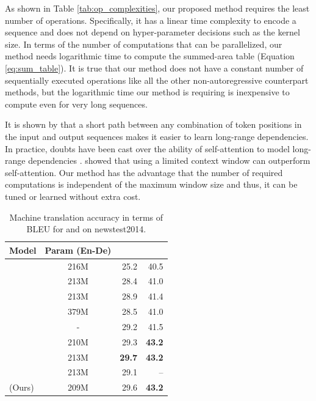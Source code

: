 \documentclass{article}
\begin{document}
As shown in Table \ref{tab:op_complexities}, our proposed method requires the least number of operations. Specifically, it has a linear time complexity to encode a sequence and does not depend on hyper-parameter decisions such as the kernel size. In terms of the number of computations that can be parallelized, our method needs logarithmic time to compute the summed-area table (Equation \ref{eq:sum_table}). It is true that our method does not have a constant number of sequentially executed operations like all the other non-autoregressive counterpart methods, but the logarithmic time our method is requiring is inexpensive to compute even for very long sequences. 

It is shown by \citet{5264952} that a short path between any combination of token positions in the input and output sequences makes it easier to learn long-range dependencies. In practice, doubts have been cast over the ability of self-attention to model long-range dependencies \cite{DBLP:journals/corr/abs-1808-08946,wu2019pay}. \citet{wu2019pay} showed that using a limited context window can outperform self-attention. Our method has the advantage that the number of required computations is independent of the maximum window size and thus, it can be tuned or learned without extra cost. 

\begin{table}[t]
\centering
\caption{Machine translation accuracy in terms of BLEU for \ende{} and \enfr{} on newstest2014.}
\vskip 0.15in
\begin{tabular}{lcrr}
\toprule
Model & Param (En-De) & \ende{} & \enfr{} \\
\midrule
\citet{gehring2017convolutional} & 216M & 25.2 & 40.5 \\
\citet{vaswani2017attention} & 213M & 28.4 & 41.0 \\
\citet{DBLP:journals/corr/abs-1711-02132} & 213M & 28.9 & 41.4 \\
\citet{DBLP:journals/corr/abs-1804-09849} & 379M & 28.5 & 41.0 \\
\citet{DBLP:journals/corr/abs-1803-02155}  & - & 29.2 & 41.5 \\
\citet{DBLP:journals/corr/abs-1806-00187} & 210M & 29.3 & \textbf{43.2} \\
\citet{wu2019pay} & 213M & \textbf{29.7} & \textbf{43.2} \\
\citet{kitaev2020reformer} & 213M & {29.1} & -- \\
\midrule
\talkconvfull{} (Ours) & 209M & 29.6 & \textbf{43.2} \\
\bottomrule
\end{tabular}
\label{tab:mt1}
\end{table}
\end{document}
